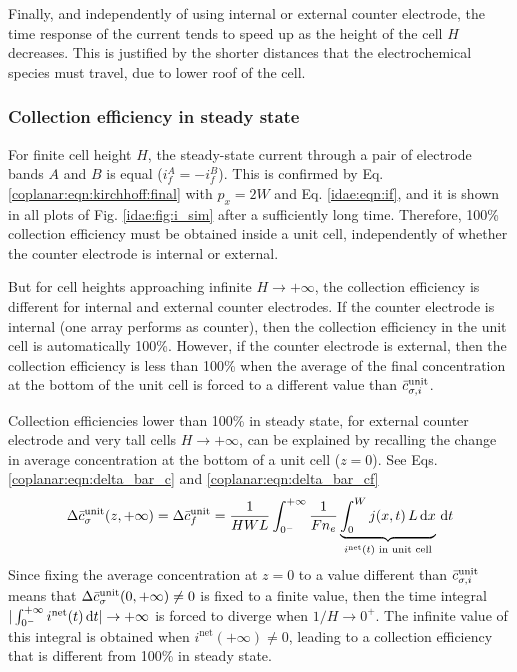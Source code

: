 Finally, and independently of using internal or external coun\-ter electrode,
the time response of the current tends to speed up
as the height of the cell $H$ decreases.
This is justified by the shorter distances
that the electrochemical species must travel, due to lower roof of the cell.

\subsubsection{Collection efficiency in steady state}

For finite cell height $H$,
the steady-state current through a pair of electrode bands $A$ and $B$ is equal ($i_{f}^{A} = -i_{f}^{B}$).
This is confirmed by Eq. \eqref{coplanar:eqn:kirchhoff:final} with $p_{x} = 2W$ and Eq. \eqref{idae:eqn:if},
and it is shown in all plots of Fig. \ref{idae:fig:i_sim} after a sufficiently long time.
Therefore, 100\% collection efficiency must be obtained inside a unit cell,
independently of whether the counter electrode is internal or external.

But for cell heights approaching infinite $H \to +\infty$,
the collection efficiency is different for internal and external counter electrodes.
If the counter electrode is internal (one array performs as counter),
then the collection efficiency in the unit cell is automatically 100\%.
However, if the counter electrode is external,
then the collection efficiency is less than 100\%
when the average of the final concentration at the bottom of the unit cell
is forced to a different value than $\bar{c}_{\sigma,i}^{\text{unit}}$.

Collection efficiencies lower than 100\% in steady state,
for external counter electrode and very tall cells $H \to +\infty$,
can be explained by recalling the change in average concentration
at the bottom of a unit cell ($z=0$).
See Eqs. \eqref{coplanar:eqn:delta_bar_c} and \eqref{coplanar:eqn:delta_bar_cf}
\begin{equation}
	\label{idae:eqn:delta_bar_cf}
	\Delta\bar{c}_{\sigma}^{\text{unit}}(z, +\infty)
	= \Delta\bar{c}_{f}^{\text{unit}}
	= \frac{1}{H W L}
	\int_{0^{-}}^{+\infty}
		\frac{1}{F n_{e}}
		\underbrace{
			\int_{0}^{W} j(x,t)\, L \,\mathrm{d}x
		}_{i^{\text{net}}(t) \text{ in unit cell}}
	\,\mathrm{d}t
\end{equation}
Since fixing the average concentration at $z = 0$
to a value different than $\bar{c}_{\sigma,i}^{\text{unit}}$ means that 
$\Delta\bar{c}_{\sigma}^{\text{unit}}(0, +\infty) \neq 0$ is fixed to a finite value,
then the time integral $|\int_{0^{-}}^{+\infty} i^{\text{net}}(t) \,\mathrm{d}t| \to +\infty$
is forced to diverge when $1/H \to 0^{+}$.
The infinite value of this integral is obtained when $i^{\text{net}}(+\infty) \neq 0$,
leading to a collection efficiency that is different from 100\% in steady state.

